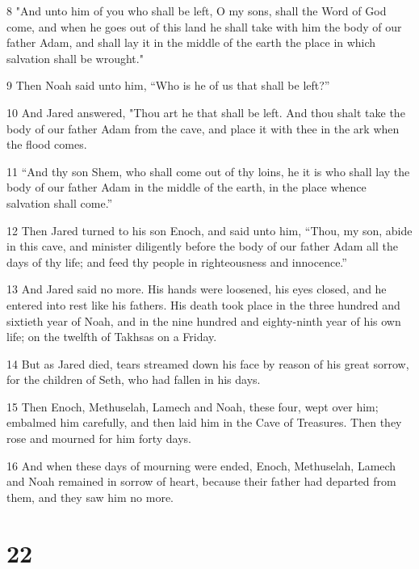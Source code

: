 \par 8 "And unto him of you who shall be left, O my sons, shall the Word of God come, and when he goes out of this land he shall take with him the body of our father Adam, and shall lay it in the middle of the earth the place in which salvation shall be wrought."

\par 9 Then Noah said unto him, “Who is he of us that shall be left?”

\par 10 And Jared answered, "Thou art he that shall be left. And thou shalt take the body of our father Adam from the cave, and place it with thee in the ark when the flood comes.

\par 11 “And thy son Shem, who shall come out of thy loins, he it is who shall lay the body of our father Adam in the middle of the earth, in the place whence salvation shall come.”

\par 12 Then Jared turned to his son Enoch, and said unto him, “Thou, my son, abide in this cave, and minister diligently before the body of our father Adam all the days of thy life; and feed thy people in righteousness and innocence.”

\par 13 And Jared said no more. His hands were loosened, his eyes closed, and he entered into rest like his fathers. His death took place in the three hundred and sixtieth year of Noah, and in the nine hundred and eighty-ninth year of his own life; on the twelfth of Takhsas on a Friday.

\par 14 But as Jared died, tears streamed down his face by reason of his great sorrow, for the children of Seth, who had fallen in his days.

\par 15 Then Enoch, Methuselah, Lamech and Noah, these four, wept over him; embalmed him carefully, and then laid him in the Cave of Treasures. Then they rose and mourned for him forty days.

\par 16 And when these days of mourning were ended, Enoch, Methuselah, Lamech and Noah remained in sorrow of heart, because their father had departed from them, and they saw him no more.

\chapter{22}

